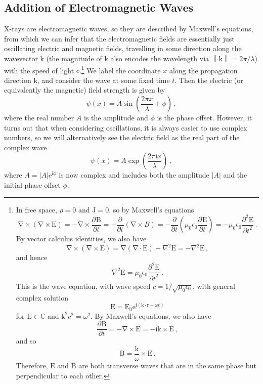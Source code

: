 \documentclass{article}
\theoremstyle{plain}\theoremheaderfont{\normalfont\itshape}\theorembodyfont{\rmfamily}\theoremseparator{.}\newtheorem*{rem}{Remark}\newtheorem*{ex}{Example}\newtheorem*{proof}{Proof}\newtheorem*{altp}{Alternative proof}
\theoremstyle{plain}\theoremheaderfont{\normalfont\bfseries}\theorembodyfont{\rmfamily}\theoremseparator{.}\newtheorem{thm}{Theorem}[section]\newtheorem{lem}[thm]{Lemma}\newtheorem{prop}[thm]{Proposition}\newtheorem*{cor}{Corollary}\newtheorem{defn}[thm]{Definition}\newtheorem{clm}[thm]{Claim}\newtheorem{clminproof}{Claim}\newtheorem*{law}{Law}\newtheorem{pos}[thm]{Postulate}
\theoremstyle{break}\theoremheaderfont{\normalfont\itshape}\theorembodyfont{\rmfamily}\theoremseparator{.\medskip}\newtheorem*{proofskip}{Proof}\newtheorem*{exs}{Examples}\newtheorem*{rems}{Remarks}
\theoremstyle{break}\theoremheaderfont{\normalfont\bfseries}\theorembodyfont{\rmfamily}\theoremseparator{.\medskip}\newtheorem{lemskip}[thm]{Lemma}\newtheorem{defnskip}[thm]{Definition}\newtheorem{propskip}[thm]{Proposition}\newtheorem{thmskip}[thm]{Theorem}
\numberwithin{equation}{section}
\newcommand{\ii}{\mathrm{i}}
\newcommand{\ee}{\mathrm{e}}
\newcommand{\pdv}[3][]{\frac{\partial^{#1} #2}{{\partial #3}^{#1}}}
\newcommand{\vb}[1]{\bm{\mathrm{#1}}}
\newcommand{\abs}[1]{\left| #1 \right|}
\newcommand{\norm}[1]{\left\| #1 \right\|}
\newcommand{\grad}{\vb{\nabla}}
\renewcommand{\div}{\vb{\nabla}\cdot}
\newcommand{\curl}{\vb{\nabla}\times}
\newcommand{\laplacian}{\nabla^2}
\begin{document}
    \subsection{Addition of Electromagnetic Waves}
    X-rays are electromagnetic waves, so they are described by Maxwell's equations, from which we can infer that the electromagnetic fields are essentially just oscillating electric and magnetic fields, travelling in some direction along the wavevector \(\vb{k}\) (the magnitude of \(\vb{k}\) also encodes the wavelength via \(\norm{\vb{k}}=2\pi/\lambda\)) with the speed of light \(c\).\footnote{In free space, \(\rho=0\) and \(\vb{J}=0\), so by Maxwell's equations
    \begin{equation}
        \curl(\curl\vb{E})=-\curl\pdv{\vb{B}}{t}=-\pdv{}{t}(\curl B)=-\pdv{}{t}\left(\mu_0\epsilon_0\pdv{\vb{E}}{t}\right)=-\mu_0\epsilon_0\pdv[2]{\vb{E}}{t}\,.
    \end{equation}
    By vector calculus identities, we also have
    \begin{equation}
        \curl(\curl\vb{E})=\grad(\div\vb{E})-\laplacian\vb{E}=-\laplacian\vb{E}\,,
    \end{equation}
    and hence
    \begin{equation}
        \laplacian\vb{E}=\mu_0\epsilon_0\pdv[2]{\vb{E}}{t}\,.
    \end{equation}
    This is the wave equation, with wave speed \(c=1/\sqrt{\mu_0\epsilon_0}\), with general complex solution
    \begin{equation}
        \vb{E}=\vb{E}_0\ee^{\ii(\vb{k}\cdot\vb{r}-\omega t)}
    \end{equation}
    for \(\vb{E}\in\mathbb{C}\) and \(\vb{k}^2 c^2=\omega^2\). By Maxwell's equations, we also have
    \begin{equation}
        \pdv{\vb{B}}{t}=-\curl\vb{E}=-\ii\vb{k}\times\vb{E}\,,
    \end{equation}
    and so
    \begin{equation}
        \vb{B}=\frac{\vb{k}}{\omega}\times\vb{E}\,.
    \end{equation}
    Therefore, \(\vb{E}\) and \(\vb{B}\) are both transverse waves that are in the same phase but perpendicular to each other.} We label the coordinate \(x\) along the propagation direction \(\vb{k}\), and consider the wave at some fixed time \(t\). Then the electric (or equivalently the magnetic) field strength is given by
    \begin{equation}
        \psi(x)=A\sin\left(\frac{2\pi x}{\lambda}+\phi\right)\,,
    \end{equation}
    where the real number \(A\) is the amplitude and \(\phi\) is the phase offset. However, it turns out that when considering oscillations, it is always easier to use complex numbers, so we will alternatively see the electric field as the real part of the complex wave
    \begin{equation}
        \psi(x)=A\exp\left(\frac{2\pi \ii x}{\lambda}\right)\,,
    \end{equation}
    where \(A=\abs{A}\ee^{\ii\phi}\) is now complex and includes both the amplitude \(\abs{A}\) and the initial phase offset \(\phi\).
\end{document}
